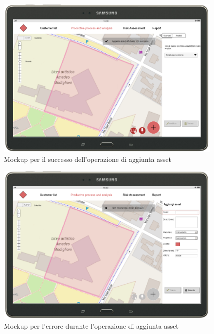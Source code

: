 \begin{figure}[H]
	\centering
	\includegraphics[scale=0.29]{img/MockUp/m5.png}
	\caption{Mockup per il successo dell'operazione di aggiunta asset}
\end{figure}
\begin{figure}[H]
	\centering
	\includegraphics[scale=0.29]{img/MockUp/m6.png}
	\caption{Mockup per l'errore durante l'operazione di aggiunta asset}
\end{figure}

\newpage
